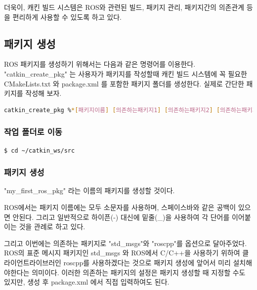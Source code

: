 더욱이, 캐킨 빌드 시스템은 ROS와 관련된 빌드, 패키지 관리, 패키지간의 의존관계 등을 편리하게 사용할 수 있도록 하고 있다. 

\subsection{패키지 생성}

ROS 패키지를 생성하기 위해서는 다음과 같은 명령어를 이용한다. "catkin\_create\_pkg" 는 사용자가 패키지를 작성할때 캐킨 빌드 시스템에 꼭 필요한 CMakeLists.txt 와 package.xml 를 포함한 패키지 폴더를 생성한다. 실제로 간단한 패키지를 작성해 보자.

\begin{lstlisting}[language=bash]
catkin_create_pkg %*[패키지이름] [의존하는패키지1] [의존하는패키지2] [의존하는패키지3]*)
\end{lstlisting}

\subsubsection{작업 폴더로 이동}

\begin{lstlisting}[language=bash]
$ cd ~/catkin_ws/src
\end{lstlisting}

\subsubsection{패키지 생성}

"my\_first\_ros\_pkg" 라는 이름의 패키지를 생성할 것이다. 

ROS에서는 패키지 이름에는 모두 소문자를 사용하며, 스페이스바와 같은 공백이 있으면 안된다. 그리고 일반적으로 하이픈(-) 대신에 밑줄(\_)을 사용하여 각 단어를 이어붙이는 것을 관례로 하고 있다. 

그리고 이번에는 의존하는 패키지로 "std\_msgs"와 "roscpp"를 옵션으로 달아주었다. ROS의 표준 메시지 패키지인 std\_msgs 와 ROS에서 C/C++을 사용하기 위하여 클라이언트라이브러인 roscpp를 사용하겠다는 것으로 패키지 생성에 앞어서 미리 설치해야한다는 의미이다. 이러한 의존하는 패키지의 설정은 패키지 생성할 때 지정할 수도 있지만, 생성 후 package.xml 에서 직접 입력하여도 된다.

